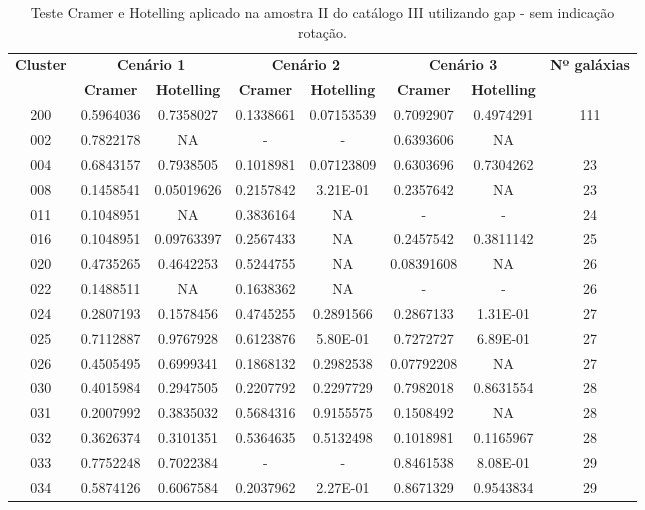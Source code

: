 \begin{anexosenv}
{\scriptsize
\begin{longtable}{cccccccc}
\caption{Teste Cramer e Hotelling aplicado na amostra II do catálogo III utilizando gap - sem indicação rotação.}\label{tab:sorinorotation3}
\hline
\multirow{2}{*}{\textbf{Cluster}} & \multicolumn{2}{|c|}{\textbf{Cenário 1}} & \multicolumn{2}{c|}{\textbf{Cenário 2}} & \multicolumn{2}{c|}{\textbf{Cenário 3}} & \multirow{2}{*}{\textbf{Nº galáxias}} \\ \cline{2-7}
                         & \multicolumn{1}{|c}{\textbf{Cramer}}       & \textbf{Hotelling}       & \textbf{Cramer}       & \textbf{Hotelling}       & \textbf{Cramer}       & \textbf{Hotelling}       &                              \\ \hline

200 & 0.5964036 & 0.7358027 & 0.1338661 & 0.07153539 & 0.7092907 & 0.4974291 & 111 \\ \hline                
002 & 0.7822178 & NA & - & - &  0.6393606 & NA & \\ 
004 & 0.6843157 & 0.7938505 & 0.1018981 & 0.07123809 & 0.6303696 & 0.7304262 & 23 \\ 
008 & 0.1458541 & 0.05019626 & 0.2157842 & 3.21E-01 & 0.2357642 & NA & 23 \\ 
011 & 0.1048951 & NA & 0.3836164 & NA & - & - &  24 \\ 
016 & 0.1048951 & 0.09763397 & 0.2567433 & NA & 0.2457542 & 0.3811142 & 25 \\ 
020 & 0.4735265 & 0.4642253 & 0.5244755 & NA & 0.08391608 & NA & 26 \\ 
022 & 0.1488511 & NA & 0.1638362 & NA & - & - &  26 \\ 
024 & 0.2807193 & 0.1578456 & 0.4745255 & 0.2891566 & 0.2867133 & 1.31E-01 & 27 \\ 
025 & 0.7112887 & 0.9767928 & 0.6123876 & 5.80E-01 & 0.7272727 & 6.89E-01 & 27 \\ 
026 & 0.4505495 & 0.6999341 & 0.1868132 & 0.2982538 & 0.07792208 & NA & 27 \\ 
030 & 0.4015984 & 0.2947505 & 0.2207792 & 0.2297729 & 0.7982018 & 0.8631554 & 28 \\ 
031 & 0.2007992 & 0.3835032 & 0.5684316 & 0.9155575 & 0.1508492 & NA & 28 \\ 
032 & 0.3626374 & 0.3101351 & 0.5364635 & 0.5132498 & 0.1018981 & 0.1165967 & 28 \\ 
033 & 0.7752248 & 0.7022384 & - & - &  0.8461538 & 8.08E-01 & 29 \\ 
034 & 0.5874126 & 0.6067584 & 0.2037962 & 2.27E-01 & 0.8671329 & 0.9543834 & 29 \\ 

\end{longtable}}
\end{anexosenv}
